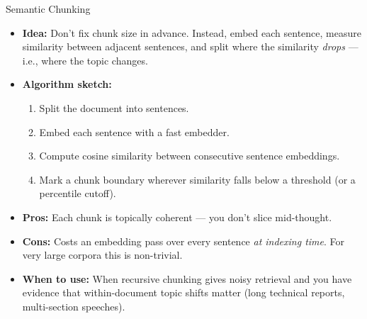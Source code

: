 \documentclass[10pt,english,aspectratio=169]{beamer}
\begin{document}
\begin{frame}{Semantic Chunking}
\begin{itemize}
\item \textbf{Idea:} Don't fix chunk size in advance. Instead, embed each sentence, measure similarity between adjacent sentences, and split where the similarity \emph{drops} --- i.e., where the topic changes.

\medskip
\item \textbf{Algorithm sketch:}
\begin{enumerate}
    \item Split the document into sentences.
    \item Embed each sentence with a fast embedder.
    \item Compute cosine similarity between consecutive sentence embeddings.
    \item Mark a chunk boundary wherever similarity falls below a threshold (or a percentile cutoff).
\end{enumerate}

\medskip
\item \textbf{Pros:} Each chunk is topically coherent --- you don't slice mid-thought.

\medskip
\item \textbf{Cons:} Costs an embedding pass over every sentence \emph{at indexing time}. For very large corpora this is non-trivial.

\medskip
\item \textbf{When to use:} When recursive chunking gives noisy retrieval and you have evidence that within-document topic shifts matter (long technical reports, multi-section speeches).
\end{itemize}
\end{frame}
\end{document}
